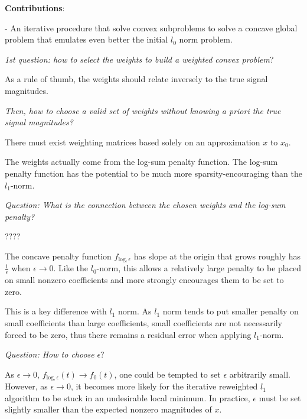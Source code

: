 \documentclass[a4paper,10pt]{article}
\theoremstyle{definition}
\begin{document}
\textbf{Contributions}:
\begin{list}{}{}
    \item - An iterative procedure that solve convex subproblems to solve a concave global problem that emulates even better the initial $l_0$ norm problem. 
\end{list}

\vskip 0.1in

\textit{1st question: how to select the weights to build a weighted convex problem}?

As a rule of thumb, the weights should relate inversely to the true signal magnitudes.

\textit{Then, how to choose a valid set of weights without knowing a priori the true signal magnitudes?}

There must exist weighting matrices based solely on an approximation $x$ to $x_0$. 

\vskip 0.1in

The weights actually come from the log-sum penalty function. The log-sum penalty function has the potential to be much more sparsity-encouraging than the $l_1$-norm.

\vskip 0.1in

\textit{Question: What is the connection between the chosen weights and the log-sum penalty?}

????

\vskip 0.1in

The concave penalty function $f_{\text{log}, \epsilon}$ has slope at the origin that grows roughly has $\frac{1}{\epsilon}$ when $\epsilon \rightarrow 0$.
Like the $l_0$-norm, this allows a relatively large penalty to be placed on small nonzero coefficients and more strongly encourages them to be set to zero.

This is a key difference with $l_1$ norm. As $l_1$ norm tends to put smaller penalty on small coefficients than large coefficients, small coefficients are not
necessarily forced to be zero, thus there remains a residual error when applying $l_1$-norm.

\vskip 0.1in

\textit{Question: How to choose} $\epsilon$?

As $\epsilon \rightarrow 0$, $f_{\text{log}, \epsilon}(t) \rightarrow f_0(t)$, one could be tempted to set $\epsilon$ arbitrarily small. However, as $\epsilon \rightarrow 0$,
it becomes more likely for the iterative reweighted $l_1$ algorithm to be stuck in an undesirable local minimum.
In practice, $\epsilon$ must be set slightly smaller than the expected nonzero magnitudes of $x$.
\end{document}

